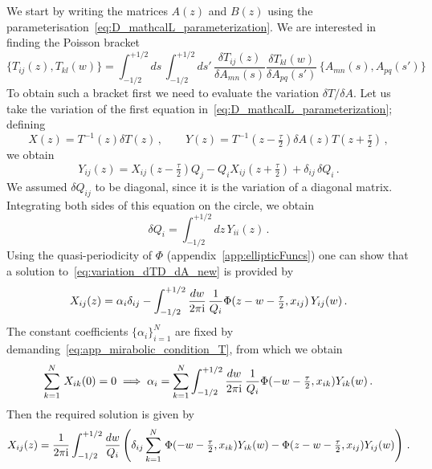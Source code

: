 We start by writing the matrices $A(z)$ and $B(z)$ using the parameterisation~\eqref{eq:D_mathcalL_parameterization}. We are interested in finding the Poisson bracket
\begin{equation}
\label{eq:TT_br_expr1}
\{T_{ij}(z) , T_{kl}(w) \} = \int^{+1/2}_{-1/2} ds  \, \int^{+1/2}_{-1/2} ds' \, \frac{\delta T_{ij}(z)}{\delta A_{mn}(s)} \frac{\delta T_{kl}(w)}{\delta A_{pq}(s')} \, \{A_{mn}(s), A_{pq}(s')\} 
\end{equation}
To obtain such a bracket first we need to evaluate the variation $\delta T/\delta A$.
Let us take the variation of the first equation in~\eqref{eq:D_mathcalL_parameterization}; defining 
\begin{equation}
X(z)= T^{-1}(z) \delta T(z) \,, \qquad Y(z) = T^{-1}(z-\tfrac{\tau}{2}) \delta A(z)  T(z+ \tfrac{\tau}{2}) \,,
\end{equation}
we obtain
\begin{equation}
\label{eq:variation_dTD_dA_new}
Y_{ij}(z) = X_{ij}(z-\tfrac{\tau}{2}) Q_j - Q_i X_{ij}(z+\tfrac{\tau}{2}) +\delta_{ij} \, \delta Q_{i} \,.
\end{equation}
We assumed $\delta Q_{ij}$ to be diagonal, since it is the variation of a diagonal matrix.
Integrating both sides of this equation on the circle, we obtain
\begin{equation}
\delta Q_i = \int^{+1/2}_{-1/2} dz\,  Y_{ii}(z) \,.
\end{equation}
Using the quasi-periodicity of $\Phi$ (appendix~\ref{app:ellipticFuncs}) one can show that a solution to~\eqref{eq:variation_dTD_dA_new} is provided by
\begin{equation}
X_{ij}(z) = \alpha_{i} \delta_{ij} - \int^{+1/2}_{-1/2}\frac{dw}{2 \pi \mathrm{i} } \, \frac{1}{Q_i} \Phi(z-w-\tfrac{\tau}{2}, x_{ij}) \, Y_{ij}(w) \,.
\end{equation}
The constant coefficients $\{\alpha_i\}^N_{i=1}$ are fixed by demanding~\eqref{eq:app_mirabolic_condition_T}, from which we obtain
\begin{equation}
\sum^N_{k=1} \, X_{ik}(0) =0 \implies \alpha_i = \sum^N_{k=1} \int^{+1/2}_{-1/2} \frac{dw}{2 \pi \mathrm{i} } \, \frac{1}{Q_i} \Phi(-w-\tfrac{\tau}{2}, x_{ik}) Y_{ik}(w) \,.
\end{equation}
Then the required solution is given by
\begin{equation}
X_{ij}(z) = \frac{1}{2 \pi \mathrm{i} } \int^{+1/2}_{-1/2} \frac{dw}{Q_i} \left(\delta_{ij} \sum^N_{k=1} \, \Phi(-w-\tfrac{\tau}{2}, x_{ik}) Y_{ik}(w) - \Phi(z-w-\tfrac{\tau}{2}, x_{ij}) Y_{ij}(w) \right) \,.
\end{equation}
